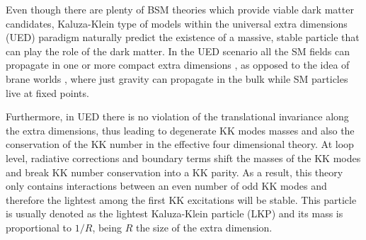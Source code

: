 Even though there are plenty of BSM theories which provide viable dark matter candidates, Kaluza-Klein type of models \cite{Kaluza1921, Klein1926} within the universal extra dimensions (UED) paradigm naturally predict the existence of a massive, stable particle that can play the role of the dark matter. In the UED scenario all the SM fields can propagate in one or more compact extra dimensions \cite{Appelquist2000}, as opposed to the idea of brane worlds \cite{Arkani-Hamed1998, Randall1999}, where just gravity can propagate in the bulk while SM particles live at fixed points.

Furthermore, in UED there is no violation of the translational invariance along the extra dimensions, thus leading to degenerate KK modes masses  and also the conservation of the KK number in the effective four dimensional theory. At loop level, radiative corrections and boundary terms shift the masses of the KK modes and break KK number conservation into a KK parity. As a result, this theory only contains interactions between an even number of odd KK modes and therefore the lightest among the first KK excitations will be stable. This particle is usually denoted as the lightest Kaluza-Klein particle (LKP) and its mass is proportional to $1/R$, being $R$ the size of the extra dimension.

